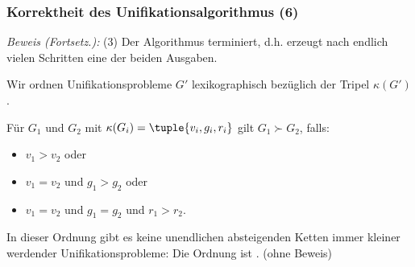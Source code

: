 \documentclass[aspectratio=1610,onlymath]{beamer}
\begin{document}
\begin{frame}[t]\frametitle{Korrektheit des Unifikationsalgorithmus (6)}


\emph{Beweis (Fortsetz.):} (3) Der Algorithmus terminiert, d.h. erzeugt nach endlich vielen Schritten eine der beiden Ausgaben.
\smallskip

Wir ordnen Unifikationsprobleme $G'$ \alert{lexikographisch} bezüglich der Tripel $\kappa(G')$.\smallskip

Für $G_1$ und $G_2$ mit $\kappa(G_i)=\tuple{v_i,g_i,r_i}$ gilt $G_1\succ G_2$, falls:
\begin{itemize}
\item $v_1>v_2$ oder
\item $v_1=v_2$ und $g_1>g_2$ oder
\item $v_1=v_2$ und $g_1=g_2$ und $r_1>r_2$.
\end{itemize}\pause

\pause

In dieser Ordnung gibt es keine unendlichen absteigenden Ketten immer kleiner werdender Unifikationsprobleme: Die Ordnung ist . (ohne Beweis)

\end{frame}
\end{document}

